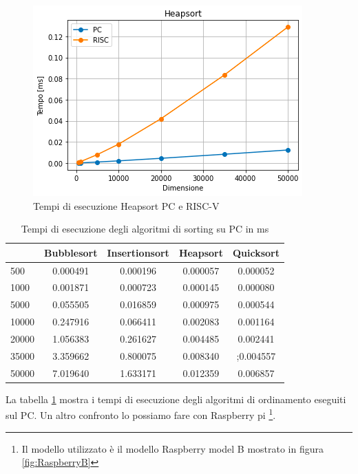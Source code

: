 \documentclass[12pt, a4paper]{report}
\begin{document}
\begin{figure}[ht]
\centering
 \includegraphics[scale=0.8]{Img/GraficiSorting/Heapsort_PC_RISC}
 \caption{Tempi di esecuzione Heapsort PC e RISC-V}
\end{figure}


	\begin{table}[ht]
		\centering
		\begin{tabular}		{| l | c | c | c | c |}
		\hline
		 & Bubblesort & Insertionsort & Heapsort & Quicksort \\ \hline
500 & 0.000491 & 0.000196 & 0.000057 & 0.000052 \\ \hline
1000 & 0.001871	 & 0.000723 & 0.000145 & 0.000080 \\ \hline
5000 & 0.055505 & 0.016859 & 0.000975 & 0.000544 \\ \hline
10000 & 0.247916 & 0.066411 & 0.002083 & 0.001164 \\ \hline
20000 & 1.056383 & 0.261627 & 0.004485 & 0.002441 \\ \hline
35000 & 3.359662 & 0.800075 & 0.008340 & ;0.004557 \\ \hline
50000 & 7.019640 & 1.633171 & 0.012359 & 0.006857 \\ \hline

		\end{tabular}
		\caption{Tempi di esecuzione degli algoritmi di sorting su PC in ms}
		\label{Fig:PcSort}
	\end{table}

La tabella \ref{Fig:PcSort} mostra i tempi di esecuzione degli algoritmi di ordinamento eseguiti sul PC. 
Un altro confronto lo possiamo fare con Raspberry pi \footnote{Il modello utilizzato è il modello Raspberry model B mostrato in figura \ref{fig:RaspberryB} }.
\end{document}

